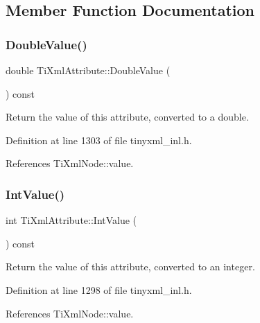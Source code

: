 \subsection{Member Function Documentation}
\hypertarget{class_ti_xml_attribute_a8cca240fb2a7130c87b0fc6156e8b34f}{}\label{class_ti_xml_attribute_a8cca240fb2a7130c87b0fc6156e8b34f} 
\subsubsection{\texorpdfstring{Double\+Value()}{DoubleValue()}}
{\footnotesize\ttfamily double Ti\+Xml\+Attribute\+::\+Double\+Value (\begin{DoxyParamCaption}{ }\end{DoxyParamCaption}) const}



Return the value of this attribute, converted to a double. 



Definition at line 1303 of file tinyxml\+\_\+inl.\+h.



References Ti\+Xml\+Node\+::value.

\hypertarget{class_ti_xml_attribute_ac8501370b065df31a35003c81d87cef2}{}\label{class_ti_xml_attribute_ac8501370b065df31a35003c81d87cef2} 
\subsubsection{\texorpdfstring{Int\+Value()}{IntValue()}}
{\footnotesize\ttfamily int Ti\+Xml\+Attribute\+::\+Int\+Value (\begin{DoxyParamCaption}{ }\end{DoxyParamCaption}) const}



Return the value of this attribute, converted to an integer. 



Definition at line 1298 of file tinyxml\+\_\+inl.\+h.



References Ti\+Xml\+Node\+::value.

\hypertarget{class_ti_xml_attribute_a008ef948268ee752b58c60d63d84bb01}{}\label{class_ti_xml_attribute_a008ef948268ee752b58c60d63d84bb01} 
